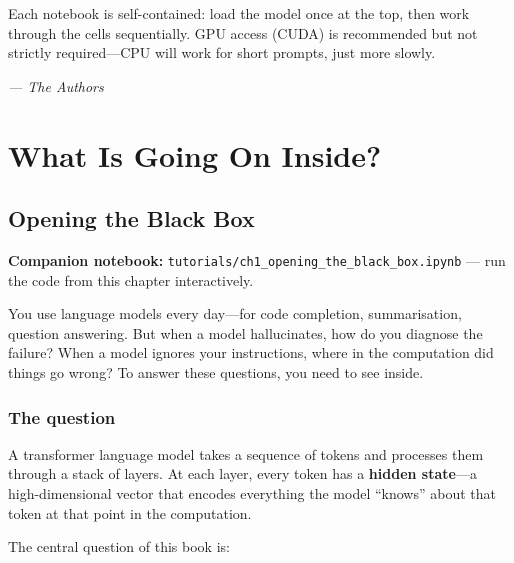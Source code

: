 \documentclass[11pt, twoside, openright]{memoir}
\newcommand{\notebook}[1]{%
  \begin{tcolorbox}[enhanced, colback=LBlue!30, colframe=Blue!60,
    left=4pt, right=4pt, top=3pt, bottom=3pt, boxrule=0.6pt, arc=2pt,
    before skip=6pt, after skip=10pt]
    {\small\sffamily\color{Navy} \textbf{Companion notebook:}
    \texttt{tutorials/#1} --- run the code from this chapter interactively.}
  \end{tcolorbox}%
}
\begin{document}
Each notebook is self-contained: load the model once at the top, then work
through the cells sequentially. GPU access (CUDA) is recommended but not
strictly required---CPU will work for short prompts, just more slowly.

\vspace{1em}
\hfill\emph{--- The Authors}

\clearpage
\pagestyle{ruled}
\tableofcontents*
\clearpage

\mainmatter

\part{What Is Going On Inside?}


\chapter{Opening the Black Box}
\label{chap:intro}

\notebook{ch1\_opening\_the\_black\_box.ipynb}

\begin{whycare}
You use language models every day---for code completion, summarisation,
question answering. But when a model hallucinates, how do you diagnose the
failure? When a model ignores your instructions, where in the computation did
things go wrong? To answer these questions, you need to see inside.
\end{whycare}

\section{The question}

A transformer language model takes a sequence of tokens and processes them
through a stack of layers. At each layer, every token has a
\textbf{hidden state}---a high-dimensional vector that encodes everything the
model ``knows'' about that token at that point in the computation.

The central question of this book is:
\end{document}
